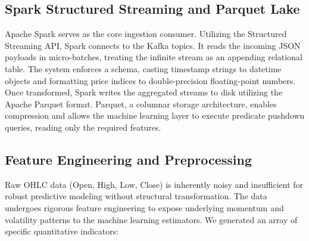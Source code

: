 \documentclass[conference]{IEEEtran}
\begin{document}
\subsection{Spark Structured Streaming and Parquet Lake}
Apache Spark serves as the core ingestion consumer. Utilizing the Structured Streaming API, Spark connects to the Kafka topics. It reads the incoming JSON payloads in micro-batches, treating the infinite stream as an appending relational table. 
The system enforces a schema, casting timestamp strings to datetime objects and formatting price indices to double-precision floating-point numbers. Once transformed, Spark writes the aggregated streams to disk utilizing the Apache Parquet format. Parquet, a columnar storage architecture, enables compression and allows the machine learning layer to execute predicate pushdown queries, reading only the required features.

\subsection{Feature Engineering and Preprocessing}
Raw OHLC data (Open, High, Low, Close) is inherently noisy and insufficient for robust predictive modeling without structural transformation. The data undergoes rigorous feature engineering to expose underlying momentum and volatility patterns to the machine learning estimators. We generated an array of specific quantitative indicators:
\end{document}
